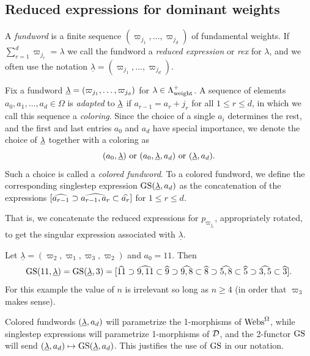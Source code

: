 \subsection{Reduced expressions for dominant weights}

\begin{defn} \label{defn:fundword} A \emph{fundword} is a finite sequence $(\varpi_{j_1}, \ldots, \varpi_{j_d})$ of fundamental weights. If $\sum_{r=1}^d \varpi_{j_r} = \lambda$ we call the fundword a \emph{reduced expression} or \emph{rex} for $\lambda$, and we often use the notation $\underline{\lambda} = (\varpi_{j_1}, \ldots, \varpi_{j_d})$. \end{defn}

\begin{defn} \label{def:GSfundword} Fix a fundword $\underline{\lambda} = (\varpi_{j_1}, \ldots, \varpi_{j_d})$
for $\lambda \in \Lambda^+_{\operatorname{weight}}$. A sequence of elements $a_0, a_1, \ldots, a_d \in \Omega$ is \emph{adapted} to $\underline{\lambda}$ if $a_{r-1} = a_r + j_r$ for all $1 \le r \le d$, in which we call this sequence a \emph{coloring}. Since the choice of a single $a_i$ determines the rest, and the first and last entries $a_0$ and $a_d$ have special importance, we denote the choice of $\underline{\lambda}$ together with a coloring as
\[ (a_0, \underline{\lambda}) \text{ or } (a_0,\underline{\lambda}, a_d) \text{ or } (\underline{\lambda}, a_d). \]
Such a choice is called a \emph{colored fundword}.
To a colored fundword, we define the corresponding singlestep expression $\operatorname{GS}(\underline{\lambda},a_d)$ as the concatenation of the expressions $[\widehat{a_{r-1}} \supset \widehat{a_{r-1}, a_r} \subset \widehat{a_r}]$ for $1 \le r \le d$. \end{defn}

That is, we concatenate the reduced expressions for $p_{\varpi_{j_r}}$, appropriately rotated, to get the singular expression associated with $\underline{\lambda}$.

\begin{example} Let $\underline{\lambda} = (\varpi_2, \varpi_1, \varpi_3, \varpi_2)$ and $a_0 = 11$. Then
\begin{equation} \operatorname{GS}(11,\underline{\lambda}) = \operatorname{GS}(\underline{\lambda},3) = [\widehat{11} \supset \widehat{9,11} \subset \widehat{9} \supset \widehat{9,8} \subset \widehat{8} \supset \widehat{5,8} \subset \widehat{5} \supset \widehat{3,5} \subset \widehat{3}]. \end{equation}
For this example the value of $n$ is irrelevant so long as $n \ge 4$ (in order that $\varpi_3$ makes sense).
\end{example}

\begin{remark} Colored fundwords $(\underline{\lambda}, a_d)$ will parametrize the 1-morphisms of $\operatorname{Webs}^{\Omega}$, while singlestep expressions will parametrize 1-morphisms of $\mathcal{D}$, and the 2-functor $\operatorname{GS}$ will send $(\underline{\lambda}, a_d) \mapsto \operatorname{GS}(\underline{\lambda}, a_d)$. This justifies the use of $\operatorname{GS}$ in our notation. \end{remark}

